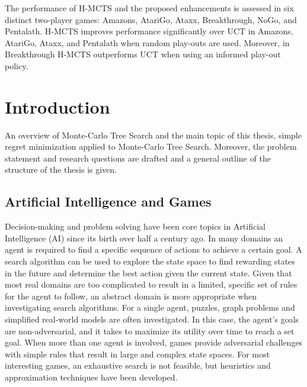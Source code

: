 \documentclass{kecsmstr}
\let\listofalgorithms\listoftables
\begin{document}
\vspace{2mm}

The performance of H-MCTS and the proposed enhancements is assessed in six distinct two-player games: Amazons, AtariGo, Ataxx, Breakthrough, NoGo, and Pentalath. H-MCTS improves performance significantly over UCT in Amazons, AtariGo, Ataxx, and Pentalath when random play-outs are used. Moreover, in Breakthrough H-MCTS outperforms UCT when using an informed play-out policy. \emptypage

\tableofcontents \clearpage
\listofalgorithms
\listoffigures \clearpage
\listoftables
{}

\chapter{Introduction}
\label{chap:intro}
\begin{chaptercontents} An overview of Monte-Carlo Tree Search and the main topic of this thesis, simple regret minimization applied to Monte-Carlo Tree Search. Moreover, the problem statement and research questions are drafted and a general outline of the structure of the thesis is given.
\end{chaptercontents}

\section{Artificial Intelligence and Games}
Decision-making and problem solving have been core topics in Artificial Intelligence (AI) since its birth over half a century ago. In many domains an agent is required to find a specific sequence of actions to achieve a certain goal. A search algorithm can be used to explore the state space to find rewarding states in the future and determine the best action given the current state.
Given that most real domains are too complicated to result in a limited, specific set of rules for the agent to follow, an abstract domain is more appropriate when investigating search algorithms. For a single agent, puzzles, graph problems and simplified real-world models are often investigated. In this case, the agent's goals are non-adversarial, and it takes to maximize its utility over time to reach a set goal. When more than one agent is involved, games provide adversarial challenges with simple rules that result in large and complex state spaces. For most interesting games, an exhaustive search is not feasible, but heuristics and approximation techniques have been developed.
\end{document}
